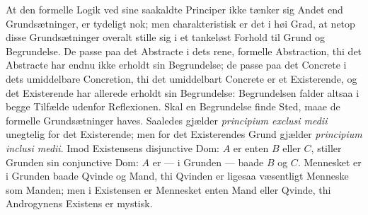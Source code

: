 \documentclass[11pt]{book}
\newcommand{\opage}[1]{\marginnote{\footnotesize\textit{[#1]}}}
\begin{document}
\opage{101} \setcounter{footnote}{0}%
At den formelle Logik ved sine saakaldte Principer ikke tænker sig
Andet end Grundsætninger, er tydeligt nok; men charakteristisk er
det i høi Grad, at netop disse Grundsætninger overalt stille sig i
et tankeløst Forhold til Grund og Begrundelse. De passe paa det
Abstracte i dets rene, formelle Abstraction, thi det Abstracte har
endnu ikke erholdt sin Begrundelse; de passe paa det Concrete i
dets umiddelbare Concretion, thi det umiddelbart Concrete er et
Existerende, og det Existerende har allerede erholdt sin
Begrundelse: Begrundelsen falder altsaa i begge Tilfælde udenfor
Reflexionen. Skal en Begrundelse finde Sted, maae de formelle
Grundsætninger haves. Saaledes gjælder \textit{principium exclusi
medii} unegtelig for det Existerende; men for det Existerendes
Grund gjælder \textit{principium inclusi medii}. Imod Existensens
disjunctive Dom: $A$ er enten $B$ eller $C$, stiller Grunden sin
conjunctive Dom: $A$ er --- i Grunden --- baade $B$ og $C$.
Mennesket er i Grunden baade Qvinde og Mand, thi Qvinden er ligesaa
væsentligt Menneske som Manden; men i Existensen er Mennesket enten
Mand eller Qvinde, thi Androgynens Existens er mystisk.
\end{document}
